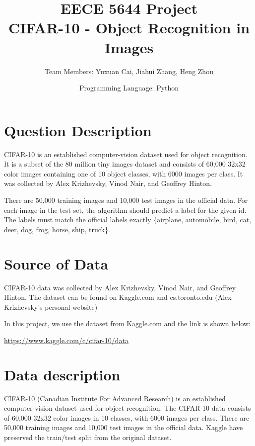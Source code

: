 \documentclass{article}
\begin{document}
\title{EECE 5644 Project\\CIFAR-10 - Object Recognition in Images}

\author{Team Members: Yuxuan Cai, Jiahui Zhang, Heng Zhou}
\date{Programming Language: Python}
\maketitle

\section{Question Description}

\hspace{1.5em}CIFAR-10 is an established computer-vision dataset used for object recognition. It is a subset of the 80 million tiny images dataset and consists of 60,000 32x32 color images containing one of 10 object classes, with 6000 images per class. It was collected by Alex Krizhevsky, Vinod Nair, and Geoffrey Hinton.

There are 50,000 training images and 10,000 test images in the official data. 
For each image in the test set, the algorithm should predict a label for the given id. The labels must match the official labels exactly \{airplane, automobile, bird, cat, deer, dog, frog, horse, ship, truck\}.

\section{Source of Data}
CIFAR-10 data was collected by Alex Krizhevsky, Vinod Nair, and Geoffrey Hinton. The dataset can be found on Kaggle.com and cs.toronto.edu (Alex Krizhevsky's personal website)

In this project, we use the dataset from Kaggle.com and the link is shown below:

\url{https://www.kaggle.com/c/cifar-10/data}

\section{Data description}
CIFAR-10 (Canadian Institute For Advanced Research) is an established computer-vision dataset used for object recognition. The CIFAR-10 data consists of 60,000 32x32 color images in 10 classes, with 6000 images per class. There are 50,000 training images and 10,000 test images in the official data. Kaggle have preserved the train/test split from the original dataset. 
\end{document}
